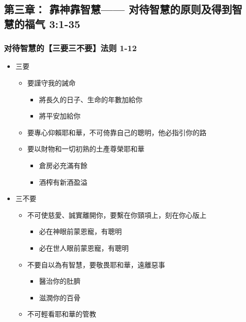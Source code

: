 \subsection{第三章： 靠神靠智慧—— 对待智慧的原则及得到智慧的福气 3:1-35}
\subsubsection{对待智慧的【三要三不要】法则 1-12}
\begin{itemize}
\itemsep-.45em  
\item 三要
\begin{itemize}
\itemsep-.45em  
\item 要謹守我的誡命
\begin{itemize}
\itemsep-.45em  
\item 將長久的日子、生命的年數加給你
\item 將平安加給你
\end{itemize}
\item 要專心仰賴耶和華，不可倚靠自己的聰明，他必指引你的路
\item 要以財物和一切初熟的土產尊榮耶和華
\begin{itemize}
\itemsep-.45em  
\item 倉房必充滿有餘
\item 酒榨有新酒盈溢
\end{itemize}
\end{itemize}
\item 三不要
\begin{itemize}
\itemsep-.45em  
\item 不可使慈愛、誠實離開你，要繫在你頸項上，刻在你心版上
\begin{itemize}
\itemsep-.45em  
\item 必在神眼前蒙恩寵，有聰明
\item 必在世人眼前蒙恩寵，有聰明
\end{itemize}
\item 不要自以為有智慧，要敬畏耶和華，遠離惡事
\begin{itemize}
\itemsep-.45em  
\item 醫治你的肚臍
\item 滋潤你的百骨
\end{itemize}
\item 不可輕看耶和華的管教
\end{itemize}
\end{itemize}
